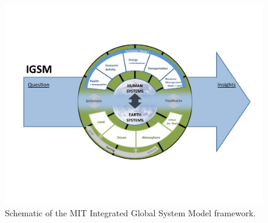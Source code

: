 \documentclass[12pt,fleqn]{article}
\begin{document}
\begin{figure}[h!]
  \centering
  \noindent\includegraphics[width=\textwidth]{../figure/IGSM_schematic.pdf}
  \caption{Schematic of the MIT Integrated Global System Model framework.}\label{fig:igsmschematic}
\end{figure}
\end{document}
